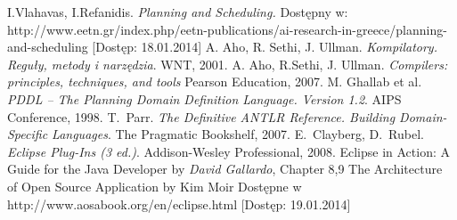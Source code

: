 \begin{thebibliography}{1}
 I.Vlahavas, I.Refanidis. \emph{Planning and Scheduling.} Dostępny w: http://www.eetn.gr/index.php/eetn-publications/ai-research-in-greece/planning-and-scheduling [Dostęp: 18.01.2014]
A. Aho, R. Sethi, J. Ullman. \emph{Kompilatory. Reguły, metody i narzędzia}.
WNT, 2001.
A. Aho, R.Sethi, J. Ullman. \emph{Compilers: principles,
techniques, and tools} Pearson Education, 2007.
M. Ghallab et al. \emph{PDDL -- The Planning Domain Definition Language. Version 1.2}.
AIPS Conference, 1998.
T.~Parr. \emph{The Definitive ANTLR Reference. Building Domain-Specific Languages}. 
The Pragmatic Bookshelf, 2007.
E.~Clayberg, D.~Rubel. \emph{Eclipse Plug-Ins (3 ed.)}. Addison-Wesley Professional, 2008. 
Eclipse in Action: A Guide for the Java Developer by \emph{David Gallardo}, Chapter 8,9
 The Architecture of Open Source Application by Kim Moir Dostępne w http://www.aosabook.org/en/eclipse.html [Dostęp: 19.01.2014]
\end{thebibliography}
